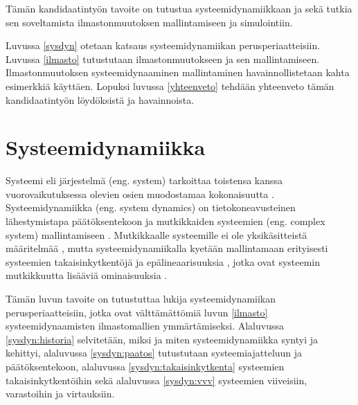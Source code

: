 \documentclass[finnish,12pt,a4paper,pdftex]{article}
\begin{document}
\begin{onehalfspacing}
Tämän kandidaatintyön tavoite on tutustua systeemidynamiikkaan ja sekä tutkia sen soveltamista ilmastonmuutoksen mallintamiseen ja simulointiin. 



Luvussa \ref{sysdyn} otetaan katsaus systeemidynamiikan perusperiaatteisiin. Luvussa \ref{ilmasto} tutustutaan ilmastonmuutokseen ja sen mallintamiseen. Ilmastonmuutoksen systeemidynaaminen mallintaminen havainnollistetaan kahta esimerkkiä käyttäen. Lopuksi luvussa \ref{yhteenveto} tehdään yhteenveto tämän kandidaatintyön löydöksistä ja havainnoista. 

\clearpage

\section{Systeemidynamiikka \label{sysdyn}}

Systeemi eli järjestelmä (eng. system) tarkoittaa toistensa kanssa vuorovaikutuksessa olevien osien muodostamaa kokonaisuutta \cite{Flood1988}. Systeemidynamiikka (eng. system dynamics) on tietokoneavusteinen lähestymistapa päätöksentekoon ja mutkikkaiden systeemien (eng. complex system) mallintamiseen \cite{WhatIsSystemDynamics}. Mutkikkaalle systeemille ei ole yksikäsitteistä määritelmää \cite{Zadeh1973}, mutta systeemidynamiikalla kyetään mallintamaan erityisesti systeemien takaisinkytkentöjä ja epälineaarisuuksia \cite{WhatIsSystemDynamics}, jotka ovat systeemin mutkikkuutta lisääviä ominaisuuksia \cite{Zadeh1973}. %

Tämän luvun tavoite on tutustuttaa lukija systeemidynamiikan perusperiaatteisiin, jotka ovat välttämättömiä luvun \ref{ilmasto} systeemidynaamisten ilmastomallien ymmärtämiseksi. Alaluvussa \ref{sysdyn:historia} selvitetään, miksi ja miten systeemidynamiikka syntyi ja kehittyi, alaluvussa \ref{sysdyn:paatos} tutustutaan systeemiajatteluun ja päätöksentekoon, alaluvussa \ref{sysdyn:takaisinkytkenta} systeemien takaisinkytkentöihin sekä alaluvussa \ref{sysdyn:vvv} systeemien viiveisiin, varastoihin ja virtauksiin. 


\end{onehalfspacing}
\end{document}
